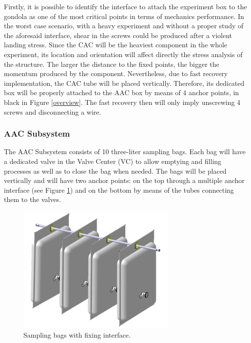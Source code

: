 \smallskip
Firstly, it is possible to identify the interface to attach the experiment box to the gondola as one of the most critical points in terms of mechanics performance. In the worst case scenario, with a heavy experiment and without a proper study of the aforesaid interface, shear in the screws could be produced after a violent landing stress. Since the CAC will be the heaviest component in the whole experiment, its location and orientation will affect directly the stress analysis of the structure. The larger the distance to the fixed points, the bigger the momentum produced by the component. Nevertheless, due to fast recovery implementation, the CAC tube will be placed vertically. Therefore, its dedicated box will be properly attached to the AAC box by means of 4 anchor points, in black in Figure \ref{overview}. The fast recovery then will only imply unscrewing 4 screws and disconnecting a wire. 

\subsubsection{AAC Subsystem}

The AAC Subsystem consists of 10 three-liter sampling bags. Each bag will have a dedicated valve in the Valve Center (VC) to allow emptying and filling processes as well as to close the bag when needed. The bags will be placed vertically and will have two anchor points: on the top through a  multiple anchor interface (see Figure \ref{anchor_bags}) and on the bottom by means of the tubes connecting them to the valves.


\begin{figure}[!ht]
    \centering
    \includegraphics[width=0.7\textwidth]{4-experiment-design/img/bags_assembly.jpg}
    \caption{Sampling bags with fixing interface.}
    \label{anchor_bags}
\end{figure}

